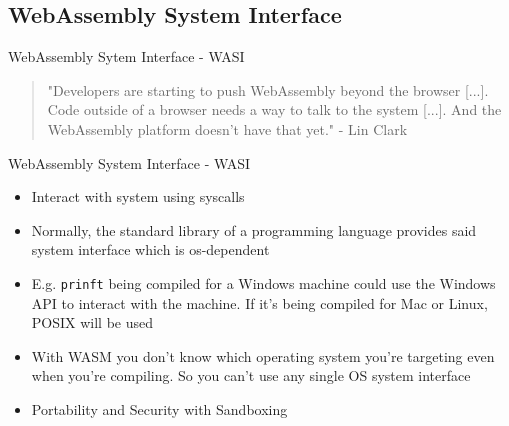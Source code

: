 \documentclass{beamer}
\begin{document}
\subsection{WebAssembly System Interface}

\begin{frame}{WebAssembly Sytem Interface - WASI}
    \begin{quotation}
        "Developers are starting to push WebAssembly beyond the browser [...]. Code outside of a browser needs a way to talk to the system [...]. And the WebAssembly platform doesn’t have that yet." - Lin Clark
    \end{quotation}
\end{frame}

\begin{frame}{WebAssembly System Interface - WASI}
\begin{itemize} 
    \item Interact with system using syscalls
    \item Normally, the standard library of a programming language provides said system interface which is os-dependent
    \item E.g. \lstinline{prinft} being compiled for a Windows machine could use the Windows API to interact with the machine. If it's being compiled for Mac or Linux, POSIX will be used
    \item With WASM you don't know which operating system you're targeting even when you're compiling. So you can't use any single OS system interface 
    \item Portability and Security with Sandboxing
\end{itemize}
\end{frame}
\end{document}
